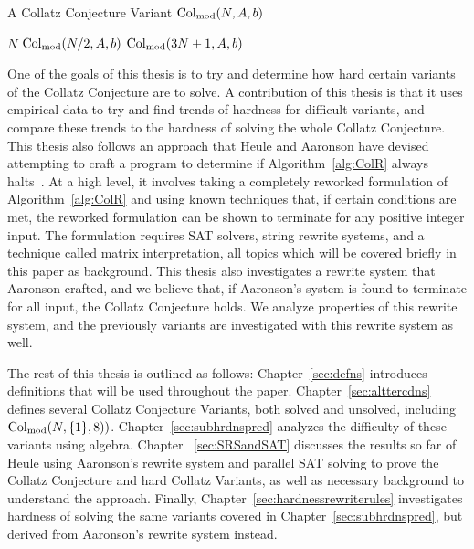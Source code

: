 \begin{algorithm} 
\caption{A Collatz Conjecture Variant $\mathrm{Col}_{\text{mod}}(N,A,b)$}
\label{alg:ColSP} 
\begin{algorithmic}[1]
     \Return $N$
    \EndIf
     \Return $\mathrm{Col}_{\text{mod}}(N/2,A,b)$
    \EndIf
    \State \Return $\mathrm{Col}_{\text{mod}}(3N+1,A,b)$ 
\end{algorithmic}
\end{algorithm}
One of the goals of this thesis is to try and determine how hard certain variants of the Collatz Conjecture are to solve. A contribution of this thesis is that it uses empirical data to try and find trends of hardness for difficult variants, and compare these trends to the hardness of solving the whole Collatz Conjecture. This thesis also follows an approach that Heule and Aaronson have devised attempting to craft a program to determine if Algorithm~\ref{alg:ColR} always halts~\cite{HeuleAaronson}. At a high level, it involves taking a completely reworked formulation of Algorithm~\ref{alg:ColR} and using known techniques that, if certain conditions are met, the reworked formulation can be shown to terminate for any positive integer input. The formulation requires SAT solvers, string rewrite systems, and a technique called matrix interpretation, all topics which will be covered briefly in this paper as background. This thesis also investigates a rewrite system that Aaronson crafted, and we believe that, if Aaronson's system is found to terminate for all input, the Collatz Conjecture holds. We analyze properties of this rewrite system, and the previously variants are investigated with this rewrite system as well.\par
The rest of this thesis is outlined as follows: Chapter~\ref{sec:defns} introduces definitions that will be used throughout the paper. Chapter~\ref{sec:alttercdns} defines several Collatz Conjecture Variants, both solved and unsolved, including $\mathrm{Col}_{\text{mod}}(N,\{1\},8))$. Chapter~\ref{sec:subhrdnspred} analyzes the difficulty of these variants using algebra. Chapter ~\ref{sec:SRSandSAT} discusses the results so far of Heule using Aaronson's rewrite system and parallel SAT solving to prove the Collatz Conjecture and hard Collatz Variants, as well as necessary background to understand the approach. Finally, Chapter~\ref{sec:hardnessrewriterules} investigates hardness of solving the same variants covered in Chapter~\ref{sec:subhrdnspred}, but derived from Aaronson's rewrite system instead.
